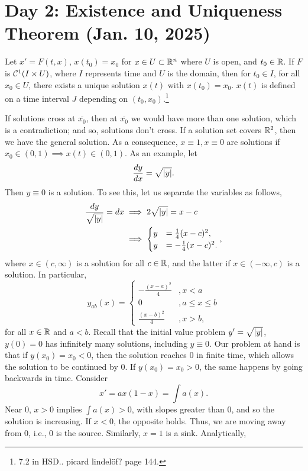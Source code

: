 \section{Day 2: Existence and Uniqueness Theorem (Jan. 10, 2025)}
\begin{simplethm}
    Let $x' = F(t, x)$, $x(t_0) = x_0$ for $x \in U \subset \mathbb R^n$ where $U$ is open, and $t_0 \in \mathbb R$. If $F$ is $\mathcal C^1(I \times U)$, where $I$ represents time and $U$ is the domain, then for $t_0 \in I$, for all $x_0 \in U$, there exists a unique solution $x(t)$ with $x(t_0) = x_0$. $x(t)$ is defined on a time interval $J$ depending on $(t_0, x_0)$.\footnote{7.2 in HSD.. picard lindel\"of? page 144.}
\end{simplethm}
\noindent If solutions cross at $\overline{x_0}$, then at $\overline{x_0}$ we would have more than one solution, which is a contradiction; and so, solutions don't cross. If a solution set covers $\mathbb R^2$, then we have the general solution. As a consequence, $x \equiv 1, x \equiv 0$ are solutions if $x_0 \in (0, 1) \implies x(t) \in (0, 1)$. As an example, let
\[ \frac{dy}{dx} = \sqrt{\left\lvert y \right\rvert}. \]
Then $y \equiv 0$ is a solution. To see this, let us separate the variables as follows,
\begin{align*}
    \frac{dy}{\sqrt{\left\lvert y \right\rvert}} = dx &\implies 2 \sqrt{\left\lvert y \right\rvert} = x - c \\
    &\implies \begin{cases} y &= \frac{1}{4}(x-c)^2, \\ y &= -\frac{1}{4}(x-c)^2. \end{cases},
\end{align*}
where $x \in (c, \infty)$ is a solution for all $c \in \mathbb R$, and the latter if $x \in (-\infty, c)$ is a solution. In particular,
\[ y_{ab}(x) = \begin{cases} - \frac{(x - a)^2}{4} &, x < a \\ 0 &, a \leq x \leq b \\ \frac{(x - b)^2}{4} &, x > b, \end{cases} \]
for all $x \in \mathbb R$ and $a < b$. Recall that the initial value problem $y' = \sqrt{\left\lvert y \right\rvert}$, $y(0) = 0$ has infinitely many solutions, including $y \equiv 0$. Our problem at hand is that if $y(x_0) = x_0 < 0$, then the solution reaches $0$ in finite time, which allows the solution to be continued by $0$. If $y(x_0) = x_0 > 0$, the same happens by going backwards in time. Consider
\[ x' = a x(1 - x) = \int a(x). \]
Near $0$, $x > 0$ implies $\int a(x) > 0$, with slopes greater than $0$, and so the solution is increasing. If $x < 0$, the opposite holds. Thus, we are moving away from $0$, i.e., $0$ is the source. Similarly, $x = 1$ is a sink. Analytically,
